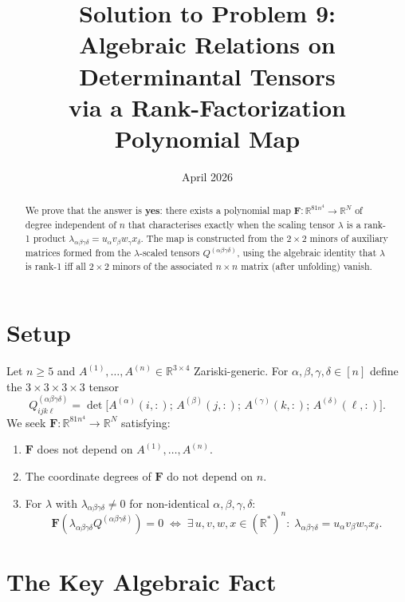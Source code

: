 \documentclass[12pt]{article}
\title{Solution to Problem 9:\\
Algebraic Relations on Determinantal Tensors\\
via a Rank-Factorization Polynomial Map}
\author{}
\date{April 2026}
\theoremstyle{definition}
\theoremstyle{remark}
\begin{document}
\maketitle

\begin{abstract}
We prove that the answer is \textbf{yes}: there exists a polynomial map
$\mathbf{F}:\mathbb{R}^{81n^4}\to\mathbb{R}^N$ of degree independent of $n$
that characterises exactly when the scaling tensor $\lambda$ is a rank-1
product $\lambda_{\alpha\beta\gamma\delta} = u_\alpha v_\beta w_\gamma x_\delta$.
The map is constructed from the $2\times 2$ minors of auxiliary matrices
formed from the $\lambda$-scaled tensors $Q^{(\alpha\beta\gamma\delta)}$,
using the algebraic identity that $\lambda$ is rank-1 iff all $2\times 2$
minors of the associated $n\times n$ matrix (after unfolding) vanish.
\end{abstract}

\section{Setup}

Let $n\geq 5$ and $A^{(1)},\dots,A^{(n)}\in\mathbb{R}^{3\times 4}$
Zariski-generic.  For $\alpha,\beta,\gamma,\delta\in[n]$ define the
$3\times 3\times 3\times 3$ tensor
\[
  Q^{(\alpha\beta\gamma\delta)}_{ijk\ell}
  = \det\!\bigl[A^{(\alpha)}(i,:);\,A^{(\beta)}(j,:);\,
                A^{(\gamma)}(k,:);\,A^{(\delta)}(\ell,:)\bigr].
\]
We seek $\mathbf{F}:\mathbb{R}^{81n^4}\to\mathbb{R}^N$ satisfying:
\begin{enumerate}
\item[(F1)] $\mathbf{F}$ does not depend on $A^{(1)},\dots,A^{(n)}$.
\item[(F2)] The coordinate degrees of $\mathbf{F}$ do not depend on $n$.
\item[(F3)] For $\lambda$ with $\lambda_{\alpha\beta\gamma\delta}\neq 0$
  for non-identical $\alpha,\beta,\gamma,\delta$:
  \[
    \mathbf{F}(\lambda_{\alpha\beta\gamma\delta}Q^{(\alpha\beta\gamma\delta)})=0
    \;\Longleftrightarrow\;
    \exists\, u,v,w,x\in(\mathbb{R}^*)^n:\;
    \lambda_{\alpha\beta\gamma\delta}=u_\alpha v_\beta w_\gamma x_\delta.
  \]
\end{enumerate}

\section{The Key Algebraic Fact}
\end{document}
